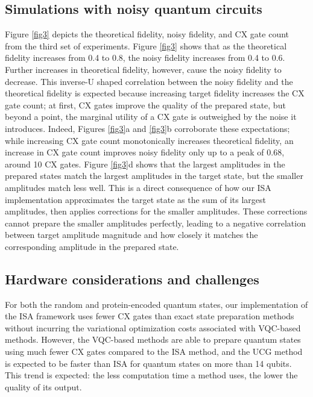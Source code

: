 \subsection{Simulations with noisy quantum circuits}
Figure \ref{fig3} depicts the theoretical fidelity, noisy fidelity, and CX
gate count from the third set of experiments. Figure
\ref{fig3} shows that as the theoretical fidelity
increases from 0.4 to 0.8, the noisy fidelity increases from 0.4 to 0.6. 
Further increases in theoretical fidelity, however, cause the noisy fidelity 
to decrease. This inverse-U shaped correlation between the noisy fidelity and 
the theoretical fidelity is expected because increasing target fidelity 
increases the CX gate count; at first, CX gates improve the quality of the 
prepared state, but beyond a point, the marginal utility of a CX gate 
is outweighed by the noise it introduces. Indeed, Figures 
\ref{fig3}a and \ref{fig3}b corroborate these
expectations; while increasing CX gate count monotonically
increases theoretical fidelity, an increase in CX gate count improves noisy
fidelity only up to a peak of 0.68, around 10 CX gates. Figure 
\ref{fig3}d shows that the largest amplitudes in the prepared 
states match the largest amplitudes in the target state, but the smaller
amplitudes match less well. This is a direct consequence of how our 
ISA implementation approximates the target state as the sum of its largest 
amplitudes, then applies corrections for the smaller amplitudes. These 
corrections cannot prepare the smaller amplitudes perfectly, leading to a 
negative correlation between target amplitude magnitude and how closely it 
matches the corresponding amplitude in the prepared state.

\subsection{Hardware considerations and challenges}
For both the random and protein-encoded quantum states, our implementation of the ISA 
framework uses fewer CX gates than exact state preparation methods without incurring 
the variational optimization costs associated with VQC-based methods. However, the 
VQC-based methods are able to prepare quantum states using much fewer CX gates 
compared to the ISA method, and the UCG method is expected to be faster than ISA for 
quantum states on more than 14 qubits. This trend is expected: the less computation 
time a method uses, the lower the quality of its output.

